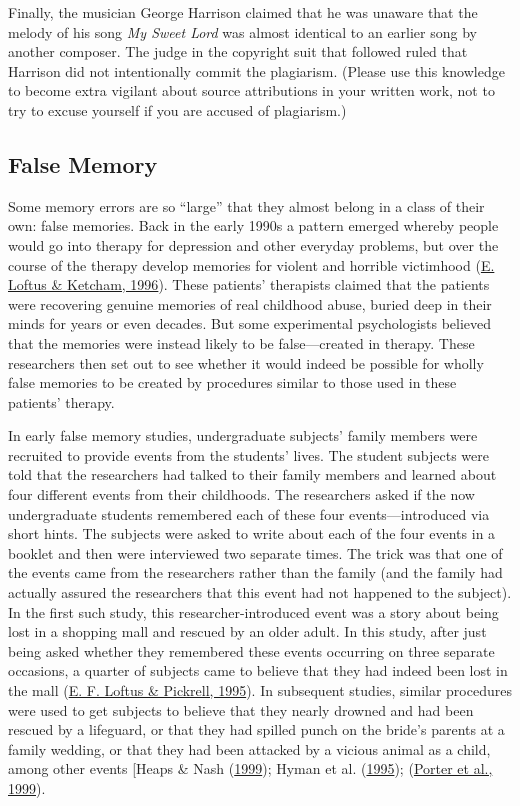 \documentclass[
]{krantz}
\begin{document}
Finally, the musician George Harrison claimed that he was unaware that the melody of his song \emph{My Sweet Lord} was almost identical to an earlier song by another composer. The judge in the copyright suit that followed ruled that Harrison did not intentionally commit the plagiarism. (Please use this knowledge to become extra vigilant about source attributions in your written work, not to try to excuse yourself if you are accused of plagiarism.)

\hypertarget{false-memory}{%
\subsection*{False Memory}\label{false-memory}}


Some memory errors are so ``large'' that they almost belong in a class of their own: false memories. Back in the early 1990s a pattern emerged whereby people would go into therapy for depression and other everyday problems, but over the course of the therapy develop memories for violent and horrible victimhood (\protect\hyperlink{ref-loftus1996myth}{E. Loftus \& Ketcham, 1996}). These patients' therapists claimed that the patients were recovering genuine memories of real childhood abuse, buried deep in their minds for years or even decades. But some experimental psychologists believed that the memories were instead likely to be false---created in therapy. These researchers then set out to see whether it would indeed be possible for wholly false memories to be created by procedures similar to those used in these patients' therapy.

In early false memory studies, undergraduate subjects' family members were recruited to provide events from the students' lives. The student subjects were told that the researchers had talked to their family members and learned about four different events from their childhoods. The researchers asked if the now undergraduate students remembered each of these four events---introduced via short hints. The subjects were asked to write about each of the four events in a booklet and then were interviewed two separate times. The trick was that one of the events came from the researchers rather than the family (and the family had actually assured the researchers that this event had not happened to the subject). In the first such study, this researcher-introduced event was a story about being lost in a shopping mall and rescued by an older adult. In this study, after just being asked whether they remembered these events occurring on three separate occasions, a quarter of subjects came to believe that they had indeed been lost in the mall (\protect\hyperlink{ref-Loftus1995}{E. F. Loftus \& Pickrell, 1995}). In subsequent studies, similar procedures were used to get subjects to believe that they nearly drowned and had been rescued by a lifeguard, or that they had spilled punch on the bride's parents at a family wedding, or that they had been attacked by a vicious animal as a child, among other events {[}Heaps \& Nash (\protect\hyperlink{ref-Heaps1999}{1999}); Hyman et al. (\protect\hyperlink{ref-Hyman1995}{1995}); (\protect\hyperlink{ref-Porter1999}{Porter et al., 1999}).
\end{document}
